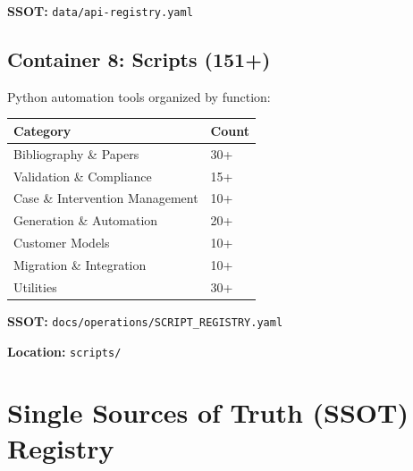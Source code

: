 \textbf{SSOT:} \texttt{data/api-registry.yaml}


\subsection{Container 8: Scripts (151+)}
\label{sec:bo-scripts}

Python automation tools organized by function:

\begin{center}
\begin{tabular}{|l|l|}
\hline
\textbf{Category} & \textbf{Count} \\
\hline
Bibliography \& Papers & 30+ \\
Validation \& Compliance & 15+ \\
Case \& Intervention Management & 10+ \\
Generation \& Automation & 20+ \\
Customer Models & 10+ \\
Migration \& Integration & 10+ \\
Utilities & 30+ \\
\hline
\end{tabular}
\end{center}

\textbf{SSOT:} \texttt{docs/operations/SCRIPT\_REGISTRY.yaml}

\textbf{Location:} \texttt{scripts/}


\section{Single Sources of Truth (SSOT) Registry}
\label{sec:bo-ssot}

